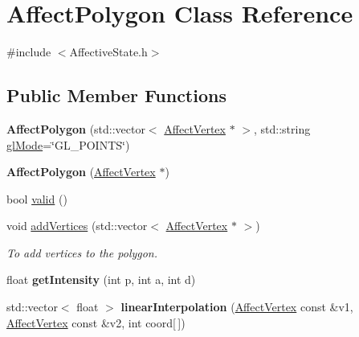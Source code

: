 \hypertarget{class_affect_polygon}{
\section{\-Affect\-Polygon \-Class \-Reference}
\label{class_affect_polygon}
}


{\ttfamily \#include $<$\-Affective\-State.\-h$>$}

\subsection*{\-Public \-Member \-Functions}
\begin{DoxyCompactItemize}
\item 
\hypertarget{class_affect_polygon_a364e906c60057bc9a6264221ba52b1bf}{
{\bfseries \-Affect\-Polygon} (std\-::vector$<$ \hyperlink{class_affect_vertex}{\-Affect\-Vertex} $\ast$ $>$, std\-::string \hyperlink{class_affect_polygon_aea731a4d326a3095686b529030266188}{gl\-Mode}=\char`\"{}\-G\-L\-\_\-\-P\-O\-I\-N\-T\-S\char`\"{})}
\label{class_affect_polygon_a364e906c60057bc9a6264221ba52b1bf}

\item 
\hypertarget{class_affect_polygon_adee033730c99195b8c6261a9530f86b4}{
{\bfseries \-Affect\-Polygon} (\hyperlink{class_affect_vertex}{\-Affect\-Vertex} $\ast$)}
\label{class_affect_polygon_adee033730c99195b8c6261a9530f86b4}

\item 
bool \hyperlink{class_affect_polygon_a8483a6d1e2f22bd6d975aad7521c3761}{valid} ()
\item 
\hypertarget{class_affect_polygon_a7af2c3c08a837bff793e6be83c81b81c}{
void \hyperlink{class_affect_polygon_a7af2c3c08a837bff793e6be83c81b81c}{add\-Vertices} (std\-::vector$<$ \hyperlink{class_affect_vertex}{\-Affect\-Vertex} $\ast$ $>$)}
\label{class_affect_polygon_a7af2c3c08a837bff793e6be83c81b81c}

\begin{DoxyCompactList}\small\item\em \-To add vertices to the polygon. \end{DoxyCompactList}\item 
\hypertarget{class_affect_polygon_a034a7b375339e53b42ebf25d94c0a76c}{
float {\bfseries get\-Intensity} (int p, int a, int d)}
\label{class_affect_polygon_a034a7b375339e53b42ebf25d94c0a76c}

\item 
\hypertarget{class_affect_polygon_a6ee97313e0d1f4199e275579142d8ea5}{
std\-::vector$<$ float $>$ {\bfseries linear\-Interpolation} (\hyperlink{class_affect_vertex}{\-Affect\-Vertex} const \&v1, \hyperlink{class_affect_vertex}{\-Affect\-Vertex} const \&v2, int coord\mbox{[}$\,$\mbox{]})}
\label{class_affect_polygon_a6ee97313e0d1f4199e275579142d8ea5}

\end{DoxyCompactItemize}
